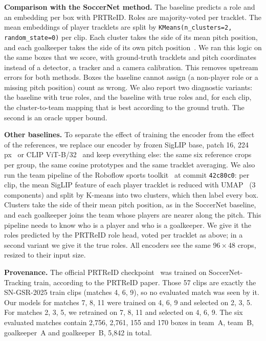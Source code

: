 \documentclass[10pt]{article}
\begin{document}
\textbf{Comparison with the SoccerNet method.} The baseline predicts a role and an embedding per box with PRTReID. Roles are majority-voted per tracklet. The mean embeddings of player tracklets are split by \texttt{KMeans(n\_clusters=2, random\_state=0)} per clip. Each cluster takes the side of its mean pitch position, and each goalkeeper takes the side of its own pitch position~\cite{sngamestate}. We ran this logic on the same boxes that we score, with ground-truth tracklets and pitch coordinates instead of a detector, a tracker and a camera calibration. This removes upstream errors for both methods. Boxes the baseline cannot assign (a non-player role or a missing pitch position) count as wrong. We also report two diagnostic variants: the baseline with true roles, and the baseline with true roles and, for each clip, the cluster-to-team mapping that is best according to the ground truth. The second is an oracle upper bound.

\textbf{Other baselines.} To separate the effect of training the encoder from the effect of the references, we replace our encoder by frozen SigLIP base, patch 16, 224 px~\cite{zhai2023siglip} or CLIP ViT-B/32~\cite{radford2021clip} and keep everything else: the same six reference crops per group, the same cosine prototypes and the same tracklet averaging. We also run the team pipeline of the Roboflow sports toolkit~\cite{roboflow2025sports} at commit \texttt{42c80c0}: per clip, the mean SigLIP feature of each player tracklet is reduced with UMAP~\cite{mcinnes2018umap} (3 components) and split by K-means into two clusters, which then label every box. Clusters take the side of their mean pitch position, as in the SoccerNet baseline, and each goalkeeper joins the team whose players are nearer along the pitch. This pipeline needs to know who is a player and who is a goalkeeper. We give it the roles predicted by the PRTReID role head, voted per tracklet as above; in a second variant we give it the true roles. All encoders see the same 96\,$\times$\,48 crops, resized to their input size.

\textbf{Provenance.} The official PRTReID checkpoint~\cite{prtreid2024weights} was trained on SoccerNet-Tracking train, according to the PRTReID paper. Those 57 clips are exactly the SN-GSR-2025 train clips (matches 4, 6, 9), so no evaluated match was seen by it. Our models for matches 7, 8, 11 were trained on 4, 6, 9 and selected on 2, 3, 5. For matches 2, 3, 5, we retrained on 7, 8, 11 and selected on 4, 6, 9. The six evaluated matches contain 2,756, 2,761, 155 and 170 boxes in team~A, team~B, goalkeeper~A and goalkeeper~B, 5,842 in total.
\end{document}
